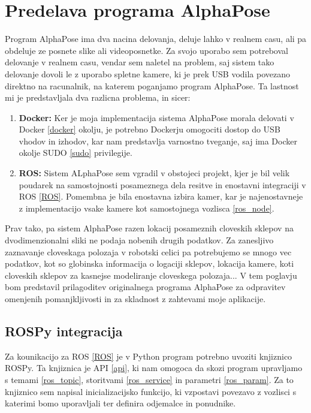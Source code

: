 \documentclass[a4paper,twoside,openright,12pt,slovene]{book}
\begin{document}
\chapter{Predelava programa AlphaPose} \label{predelava_alphapose}
Program AlphaPose ima dva nacina delovanja, deluje lahko v realnem casu, ali pa obdeluje ze posnete slike ali videoposnetke. Za svojo uporabo sem potreboval delovanje v realnem casu, vendar sem naletel na problem, saj sistem tako delovanje dovoli le z uporabo spletne kamere, ki je prek USB vodila povezano direktno na racunalnik, na katerem poganjamo program AlphaPose. Ta lastnost mi je predstavljala dva razlicna problema, in sicer:
\begin{enumerate}
    \item \textbf{Docker:} Ker je moja implementacija sistema AlphaPose morala delovati v Docker \ref{docker} okolju, je potrebno Dockerju omogociti dostop do USB vhodov in izhodov, kar nam predstavlja varnostno tveganje, saj ima Docker okolje SUDO \ref{sudo} privilegije.

    \item \textbf{ROS:} Sistem ALphaPose sem vgradil v obstojeci projekt, kjer je bil velik poudarek na samostojnosti posameznega dela resitve in enostavni integraciji v ROS \ref{ROS}. Pomembna je bila enostavna izbira kamer, kar je najenostavneje z implementacijo vsake kamere kot samostojnega vozlisca \ref{ros_node}.
\end{enumerate}
Prav tako, pa sistem AlphaPose razen lokacij posameznih cloveskih sklepov na dvodimenzionalni sliki ne podaja nobenih drugih podatkov. Za zanesljivo zaznavanje cloveskaga polozaja v robotski celici pa potrebujemo se mnogo vec podatkov, kot so globinska informacija o logaciji sklepov, lokacija kamere, koti cloveskih sklepov za kasnejse modeliranje cloveskega polozaja... V tem poglavju bom predstavil prilagoditev originalnega programa AlphaPose za odpravitev omenjenih pomanjkljivosti in za skladnost z zahtevami moje aplikacije.

\section{ROSPy integracija} Za kounikacijo za ROS \ref{ROS} je v Python program potrebno uvoziti knjiznico ROSPy. Ta knjiznica je API \ref{api}, ki nam omogoca da skozi program upravljamo s temami \ref{ros_topic}, storitvami \ref{ros_service} in parametri \ref{ros_param}. Za to knjiznico sem napisal inicializacijsko funkcijo, ki vzpostavi povezavo z vozlisci s katerimi bomo uporavljali ter definira odjemalce in ponudnike.
\end{document}

